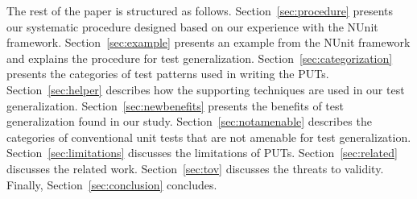 The rest of the paper is structured as follows. 
Section~\ref{sec:procedure} presents our systematic procedure designed based on our experience with the NUnit framework. 
Section~\ref{sec:example} presents an example from the NUnit framework and explains the procedure for test generalization.  
Section~\ref{sec:categorization} presents the categories of test patterns used in writing the PUTs. 
Section~\ref{sec:helper} describes how the supporting techniques are used in our test generalization. 
Section~\ref{sec:newbenefits} presents the benefits of test generalization found in our study. 
Section~\ref{sec:notamenable} describes the categories of conventional unit tests that are not amenable for test generalization.
Section~\ref{sec:limitations} discusses the limitations of PUTs. Section~\ref{sec:related} discusses the related work. Section~\ref{sec:tov} discusses the threats to validity. Finally, Section~\ref{sec:conclusion} concludes.